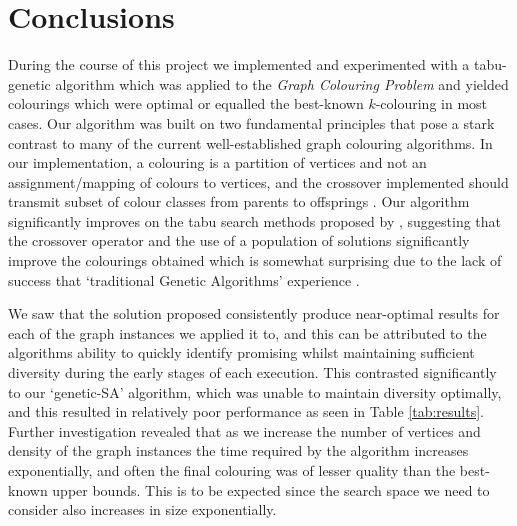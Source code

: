 \documentclass[12pt,a4paper]{article}
\begin{document}
\section{Conclusions}
\par During the course of this project we implemented and experimented with a tabu-genetic algorithm which was applied to the \textit{Graph Colouring Problem} and yielded colourings which were optimal or equalled the best-known $k$-colouring in most cases.  Our algorithm was built on two fundamental principles that pose a stark contrast to many of the current well-established graph colouring algorithms. In our implementation, a colouring is a partition of vertices and not an assignment/mapping of colours to vertices, and the crossover implemented should transmit subset of colour classes from parents to offsprings \cite{Hao}. Our algorithm significantly improves on the tabu search methods proposed by \cite{Hertz}, suggesting that the crossover operator and the use of a population of solutions significantly improve the colourings obtained which is somewhat surprising due to the lack of success that `traditional Genetic Algorithms' experience \cite{Davis}.
\par  We saw that the solution proposed consistently produce near-optimal results for each of the graph instances we applied it to, and this can be attributed to the algorithms ability to quickly identify promising whilst maintaining sufficient diversity during the early stages of each execution. This contrasted significantly to our `genetic-SA' algorithm, which was unable to maintain diversity optimally, and this resulted in relatively poor performance as seen in Table \ref{tab:results}. Further investigation revealed that as we increase the number of vertices and density of the graph instances the time required by the algorithm increases exponentially, and often the final colouring was of lesser quality than the best-known upper bounds. This is to be expected since the search space we need to consider also increases in size exponentially. 
\end{document}
